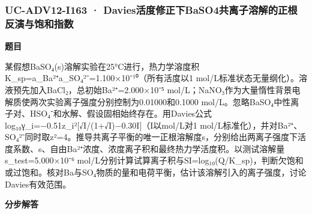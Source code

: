 \documentclass[UTF8,11pt,a4paper]{ctexart}
\begin{document}
\subsubsection*{UC-ADV12-I163 · Davies活度修正下BaSO4共离子溶解的正根反演与饱和指数}
\noindent\textbf{题目}\par
某假想BaSO₄(s)溶解实验在25°C进行，热力学溶度积K\_sp=a\_Ba²⁺a\_SO₄²⁻=1.100×10⁻¹⁰（所有活度以1 mol/L标准状态无量纲化）。溶液预先加入BaCl₂，总初始Ba²⁺=2.000×10⁻⁵ mol/L；NaNO₃作为大量惰性背景电解质使两次实验离子强度分别控制为0.01000和0.1000 mol/L。忽略BaSO₄中性离子对、HSO₄⁻和水解、假设固相始终存在。用Davies公式log₁₀γ\_i=−0.51z\_i²[√I/(1+√I)−0.30I]（I以mol/L对1 mol/L标准化），并对Ba²⁺、SO₄²⁻同时取z²=4。推导共离子平衡的唯一正根溶解度s，分别给出两离子强度下活度系数、s、自由Ba²⁺浓度、浓度离子积和最终热力学活度积。以测试溶解量s\_test=5.000×10⁻⁶ mol/L分别计算试算离子积与SI=log₁₀(Q/K\_sp)，判断欠饱和或过饱和。核对Ba与SO₄物质的量和电荷平衡，估计该溶解引入的离子强度，讨论Davies有效范围。\par
\medskip\noindent\textbf{分步解答}
\end{document}
